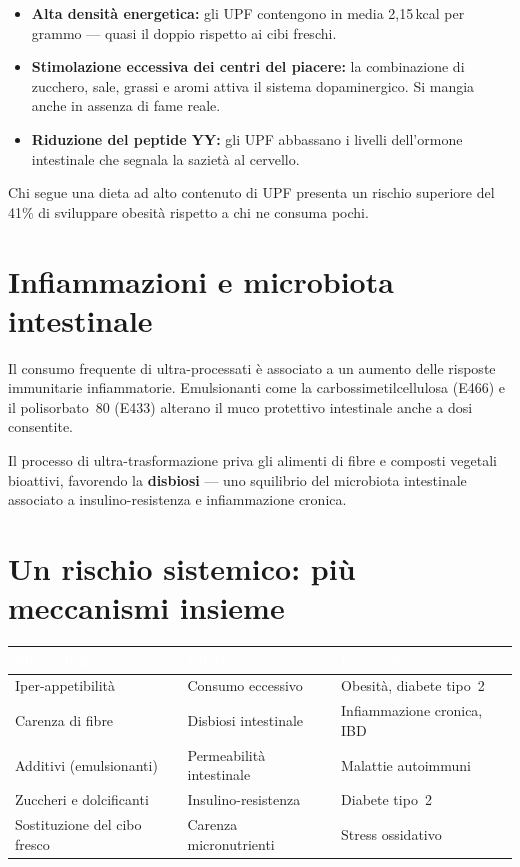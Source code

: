 \documentclass[a5paper,12pt,oneside,openany]{book}
\newcommand{\boxrosso}[2]{%
  \begin{tcolorbox}[boxbase,
    colback=rosso!8!white, colframe=rosso, title={#1}]
  #2\end{tcolorbox}}
\begin{document}
\begin{itemize}
  \item \textbf{Alta densità energetica:} gli UPF contengono in media
    2,15\,kcal per grammo --- quasi il doppio rispetto ai cibi freschi.
  \item \textbf{Stimolazione eccessiva dei centri del piacere:} la
    combinazione di zucchero, sale, grassi e aromi attiva il sistema
    dopaminergico. Si mangia anche in assenza di fame reale.
  \item \textbf{Riduzione del peptide YY:} gli UPF abbassano i livelli
    dell'ormone intestinale che segnala la sazietà al cervello.
\end{itemize}

\boxrosso{+41\% di rischio di obesità addominale}{Chi segue una dieta ad
alto contenuto di UPF presenta un rischio superiore del 41\% di sviluppare
obesità rispetto a chi ne consuma pochi.}

\section{Infiammazioni e microbiota intestinale}

Il consumo frequente di ultra-processati è associato a un aumento delle
risposte immunitarie infiammatorie. Emulsionanti come la
carbossimetilcellulosa (E466) e il polisorbato~80 (E433) alterano il
muco protettivo intestinale anche a dosi consentite.

Il processo di ultra-trasformazione priva gli alimenti di fibre e composti
vegetali bioattivi, favorendo la \textbf{disbiosi} --- uno squilibrio del
microbiota intestinale associato a insulino-resistenza e infiammazione
cronica.

\section{Un rischio sistemico: più meccanismi insieme}

{\small
\begin{tabularx}{\textwidth}{|L|L|L|}
\hline
{}
\textcolor{white}{\textbf{Meccanismo}}
  & \textcolor{white}{\textbf{Effetto}}
  & \textcolor{white}{\textbf{Conseguenza}} \\
\hline
Iper-appetibilità & Consumo eccessivo & Obesità, diabete tipo~2 \\
\hline
Carenza di fibre & Disbiosi intestinale & Infiammazione cronica, IBD \\
\hline
Additivi (emulsionanti) & Permeabilità intestinale & Malattie autoimmuni \\
\hline
Zuccheri e dolcificanti & Insulino-resistenza & Diabete tipo~2 \\
\hline
Sostituzione del cibo fresco & Carenza micronutrienti & Stress ossidativo \\
\hline
\end{tabularx}
}
\end{document}
